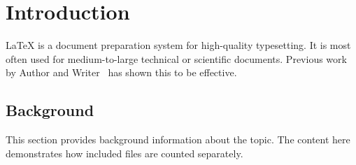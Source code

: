 \section{Introduction}
LaTeX is a document preparation system for high-quality typesetting.
It is most often used for medium-to-large technical or scientific documents.
Previous work by Author and Writer~\cite{sample2023} has shown this to be effective.

\subsection{Background}
This section provides background information about the topic.
The content here demonstrates how included files are counted separately.
